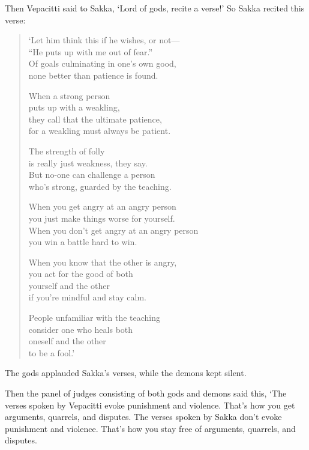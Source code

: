 \documentclass[12pt,openany]{book}%
\begin{document}
Then Vepacitti said to Sakka, ‘Lord of gods, recite a verse!’ So Sakka recited this verse: 

\begin{verse}%
‘Let him think this if he wishes, or not—\\
“He puts up with me out of fear.” \\
Of goals culminating in one’s own good, \\
none better than patience is found. 

When a strong person \\
puts up with a weakling, \\
they call that the ultimate patience, \\
for a weakling must always be patient. 

The strength of folly \\
is really just weakness, they say. \\
But no-one can challenge a person \\
who’s strong, guarded by the teaching. 

When you get angry at an angry person \\
you just make things worse for yourself. \\
When you don’t get angry at an angry person \\
you win a battle hard to win. 

When you know that the other is angry, \\
you act for the good of both \\
yourself and the other \\
if you’re mindful and stay calm. 

People unfamiliar with the teaching \\
consider one who heals both \\
oneself and the other \\
to be a fool.’ 

%
\end{verse}

The gods applauded Sakka’s verses, while the demons kept silent. 

Then the panel of judges consisting of both gods and demons said this, ‘The verses spoken by Vepacitti evoke punishment and violence. That’s how you get arguments, quarrels, and disputes. The verses spoken by Sakka don’t evoke punishment and violence. That’s how you stay free of arguments, quarrels, and disputes. 
\end{document}
